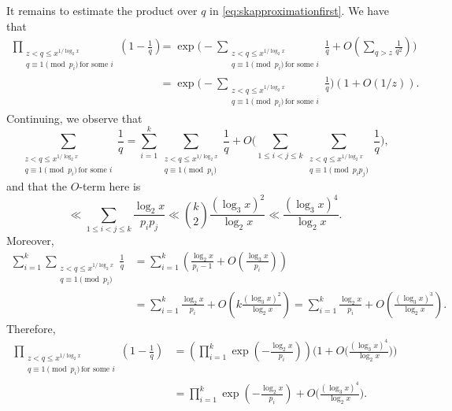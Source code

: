 \documentclass[11pt]{amsart}
\theoremstyle{remark}
\begin{document}
It remains to estimate the product over $q$ in \eqref{eq:skapproximationfirst}. We have that
\begin{align*} \prod_{\substack{z < q\le x^{1/\log_2 x} \\ q\equiv 1\!\!\!\!\!\pmod{p_i}\,\text{for some $i$}}}\left(1-\frac{1}{q}\right) &= \exp\Bigg(-\sum_{\substack{z < q\le x^{1/\log_2 x} \\ q\equiv 1\!\!\!\!\!\pmod{p_i}\,\text{for some $i$}}}\frac{1}{q} + O\left(\sum_{q > z}\frac{1}{q^2}\right)\Bigg) \\
&= \exp\Bigg(-\sum_{\substack{z < q\le x^{1/\log_2 x} \\ q\equiv 1\!\!\!\!\!\pmod{p_i}\,\text{for some $i$}}}\frac{1}{q}\Bigg)(1+O(1/z)).
\end{align*}
Continuing, we observe that
\[ \sum_{\substack{z < q\le x^{1/\log_2 x} \\ q\equiv 1\!\!\!\!\!\pmod{p_i}\,\text{for some $i$}}}\frac{1}{q}  = \sum_{i=1}^{k} \sum_{\substack{z < q \le x^{1/\log_2 x} \\ q \equiv 1\!\!\!\!\!\pmod{p_i}}} \frac{1}{q} + O\Bigg(\sum_{1 \le i < j \le k}\sum_{\substack{z < q \le x^{1/\log_2 x} \\ q \equiv 1\!\!\!\!\!\pmod{p_i p_j}}}\frac{1}{q}\Bigg), \]
and that the $O$-term here is
\[ \ll \sum_{1 \le i < j \le k}\frac{\log_2 x}{p_i p_j} \ll \binom{k}{2}  \frac{(\log_3 x)^2}{\log_2 x} \ll \frac{(\log_3 x)^4}{\log_2 x}. \]
Moreover,
\begin{align*} \sum_{i=1}^{k} \sum_{\substack{z < q \le x^{1/\log_2 x} \\q \equiv 1\!\!\!\!\pmod{p_i}}} \frac{1}{q} &= \sum_{i=1}^{k} \left(\frac{\log_2 x}{p_i-1} + O\left(\frac{\log_3 x}{p_i}\right)\right)
\\&= \sum_{i=1}^{k} \frac{\log_2 x}{p_i} + O\left(k \frac{(\log_3 x)^2}{\log_2 x}\right) = \sum_{i=1}^{k} \frac{\log_2 x}{p_i} + O\left(\frac{(\log_3 x)^3}{\log_2 x}\right).\end{align*}
Therefore,
\begin{align*} \prod_{\substack{z < q\le x^{1/\log_2 x} \\ q\equiv 1\!\!\!\!\!\pmod{p_i}\,\text{for some $i$}}}\left(1-\frac{1}{q}\right) &= \left(\prod_{i=1}^{k} \exp\left(-\frac{\log_2 x}{p_i}\right)\right) \Bigg(1+O\bigg(\frac{(\log_3 x)^4}{\log_2 x}\bigg)\Bigg) \\
&= \prod_{i=1}^{k}\exp\left(-\frac{\log_2 x}{p_i}\right)  + O\bigg(\frac{(\log_3 x)^4}{\log_2 x}\bigg). \end{align*}
\end{document}

